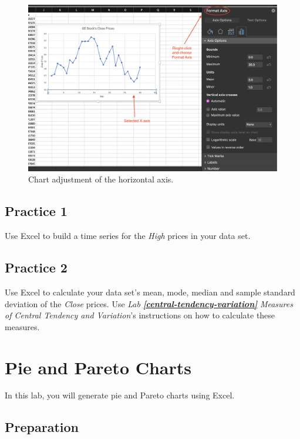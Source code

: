 \documentclass[
]{book}
\begin{document}
\begin{figure}

{\centering \includegraphics[width=0.8\linewidth]{adjust-axis} 

}

\caption{Chart adjustment of the horizontal axis.}\label{fig:adjust-axis}
\end{figure}

\hypertarget{practice-1-3}{%
\section{Practice 1}\label{practice-1-3}}

Use Excel to build a time series for the \emph{High} prices in your data set.

\hypertarget{practice-2-3}{%
\section{Practice 2}\label{practice-2-3}}

Use Excel to calculate your data set's mean, mode, median and sample standard deviation of the \emph{Close} prices. Use \emph{Lab} \textbf{\emph{\ref{central-tendency-variation}}} \emph{Measures of Central Tendency and Variation}'s instructions on how to calculate these measures.

\hypertarget{pie-and-pareto-charts}{%
\chapter{Pie and Pareto Charts}\label{pie-and-pareto-charts}}

In this lab, you will generate pie and Pareto charts using Excel.

\hypertarget{preparation-3}{%
\section{Preparation}\label{preparation-3}}
\end{document}
